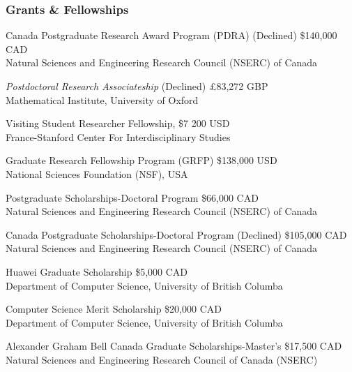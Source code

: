 \subsubsection{Grants \& Fellowships}
\begin{description}[leftmargin=\mleftsize,style=nextline,font=\normalfont\space]
    \item[2026]
          Canada Postgraduate Research Award Program (PDRA)
          \hfill (Declined) \$140,000 CAD\\
          Natural Sciences and Engineering Research Council (NSERC) of Canada
    \item[2026]
          \textit{Postdoctoral Research Associateship}
          \hfill (Declined) \pounds83,272 GBP\\
          Mathematical Institute, University of Oxford
    \item[2024] Visiting Student Researcher Fellowship, \hfill \$7 200 USD\\
          France-Stanford Center For Interdisciplinary Studies
    \item[2020] Graduate Research Fellowship Program (GRFP) \hfill \$138,000 USD\\
          National Sciences Foundation (NSF), USA
    \item[2020] Postgraduate Scholarships-Doctoral Program \hfill \$66,000 CAD\\
          Natural Sciences and Engineering Research Council (NSERC) of Canada
    \item[2020] Canada Postgraduate Scholarships-Doctoral Program \hfill (Declined) \$105,000 CAD\\
          Natural Sciences and Engineering Research Council (NSERC) of Canada
    \item[2019] Huawei Graduate Scholarship \hfill \$5,000 CAD\\
          Department of Computer Science, University of British Columba
    \item[2018] Computer Science Merit Scholarship \hfill \$20,000 CAD\\
          Department of Computer Science, University of British Columba
    \item[2018] Alexander Graham Bell Canada Graduate Scholarships-Master's \hfill \$17,500 CAD\\
          Natural Sciences and Engineering Research Council of Canada (NSERC)
\end{description}

